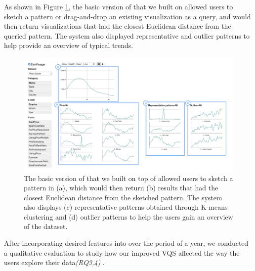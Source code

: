 \par As shown in Figure \ref{oldZV}, the basic version of \zv that we built on allowed users to sketch a pattern or drag-and-drop an existing visualization as a query, and \zv would then return visualizations that had the closest Euclidean distance from the queried pattern. The system also displayed representative and outlier patterns to help provide  an overview of typical trends.
	\begin{figure}[ht!]
	\centering
	\includegraphics[width=\linewidth]{figures/oldZV_nozql.png}
	\caption{The basic version of \zv that we built on top of allowed users to sketch a pattern in (a), which would then return (b) results that had the closest Euclidean distance from the sketched pattern. The system also displays (c) representative patterns obtained through K-means clustering and (d) outlier patterns to help the users gain an overview of the dataset. }
	\label{oldZV}
	\end{figure}
\par After incorporating desired features into \ourVQS over the period of a year, we conducted a qualitative evaluation to study how our improved VQS affected the way the users explore their data{\em (RQ3,4)} . 
